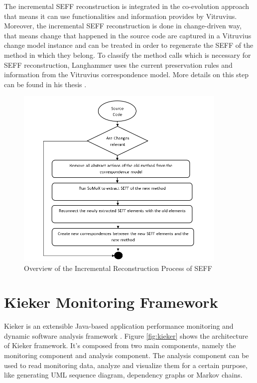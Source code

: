 The incremental SEFF reconstruction is integrated in the co-evolution approach that means it can use functionalities and information provides by Vitruvius. Moreover, the incremental SEFF reconstruction is done in change-driven way, that means change that happened in the source code are captured in a Vitruvius change model instance and can be treated in order to regenerate the SEFF of the method in which they belong. To classify the method calls which is necessary for SEFF reconstruction, Langhammer uses the current preservation rules and information from the Vitruvius correspondence model. More details on this step can be found in his thesis \cite{langhammer2017automated}.

\begin{figure}[h]
\centering
\includegraphics[width=0.9\textwidth]{figures/inscremental_seff_reconst}
\caption{Overview of the Incremental Reconstruction Process of SEFF}
\label{fig:seff incremental reconst}
\end{figure}


\section{Kieker Monitoring Framework}
\label{sec:Kieker Monitoring}
Kieker is an extensible Java-based application performance monitoring and dynamic software analysis framework \cite{van2009continuous}. Figure \ref{fig:kieker} shows the architecture of Kieker framework. It's composed from two main components, namely the monitoring component and analysis component.   The analysis component can be used to read monitoring data, analyze and visualize them for a certain purpose, like generating UML sequence diagram, dependency graphs or Markov chains.

